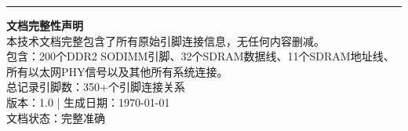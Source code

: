 \documentclass[12pt]{article}
\begin{document}
\vspace{1cm}
\begin{center}
    \color{tableheader}\rule{\textwidth}{0.8pt}
    
    \vspace{5pt}
    \textbf{文档完整性声明} \\
    \small
    本技术文档完整包含了所有原始引脚连接信息，无任何内容删减。\\
    包含：200个DDR2 SODIMM引脚、32个SDRAM数据线、11个SDRAM地址线、\\
    所有以太网PHY信号以及其他所有系统连接。\\
    总记录引脚数：350+个引脚连接关系 \\
    版本：1.0 | 生成日期：\today \\
    文档状态：完整准确
\end{center}
\end{document}
